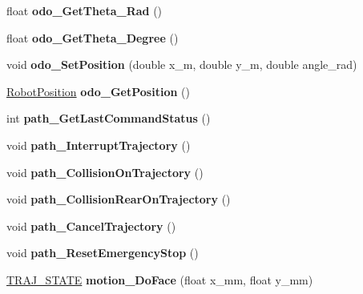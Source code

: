 \begin{DoxyCompactItemize}
float {\bfseries odo\+\_\+\+Get\+Theta\+\_\+\+Rad} ()
\item 
\mbox{\label{classAsservDriver_af764eb227ab106c4dde5c4642cf42e6e}} 
float {\bfseries odo\+\_\+\+Get\+Theta\+\_\+\+Degree} ()
\item 
\mbox{\label{classAsservDriver_a4b33794f81ea6c66cd04e1ef1d369868}} 
void {\bfseries odo\+\_\+\+Set\+Position} (double x\+\_\+m, double y\+\_\+m, double angle\+\_\+rad)
\item 
\mbox{\label{classAsservDriver_a0a62fbec28bfc5510eb75b6ad434baed}} 
\hyperlink{structRobotPosition}{Robot\+Position} {\bfseries odo\+\_\+\+Get\+Position} ()
\item 
\mbox{\label{classAsservDriver_ac4b8627777e76c145265a8e988852484}} 
int {\bfseries path\+\_\+\+Get\+Last\+Command\+Status} ()
\item 
\mbox{\label{classAsservDriver_affc4e315cdd03c826cea17114d02a19c}} 
void {\bfseries path\+\_\+\+Interrupt\+Trajectory} ()
\item 
\mbox{\label{classAsservDriver_a6af616f39706df060f1b81b2047c7a7f}} 
void {\bfseries path\+\_\+\+Collision\+On\+Trajectory} ()
\item 
\mbox{\label{classAsservDriver_a370b2f287b352211c07a023edcb63bc7}} 
void {\bfseries path\+\_\+\+Collision\+Rear\+On\+Trajectory} ()
\item 
\mbox{\label{classAsservDriver_a7f18af77a8524e09f8c9b024d4f0e4b8}} 
void {\bfseries path\+\_\+\+Cancel\+Trajectory} ()
\item 
\mbox{\label{classAsservDriver_aa54769b7bbe83fefa64925aa60089096}} 
void {\bfseries path\+\_\+\+Reset\+Emergency\+Stop} ()
\item 
\mbox{\label{classAsservDriver_af7b023caadc3314c7640c98378829636}} 
\hyperlink{path__manager_8h_adb3360abeb29758da93865c8afcb80eb}{T\+R\+A\+J\+\_\+\+S\+T\+A\+TE} {\bfseries motion\+\_\+\+Do\+Face} (float x\+\_\+mm, float y\+\_\+mm)

\end{DoxyCompactItemize}
